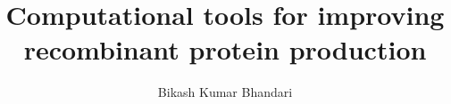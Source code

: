 \author{Bikash Kumar Bhandari}

\title{\bfseries Computational tools for improving recombinant protein production}






